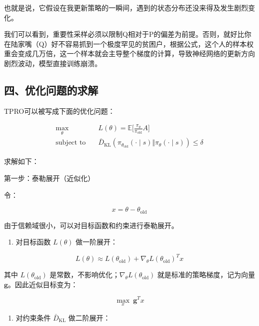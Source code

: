 也就是说，它假设在我更新策略的一瞬间，遇到的状态分布还没来得及发生剧烈变化。

我们可以看到，重要性采样必须以限制Q相对于P的偏差为前提。否则，就好比你在陆家嘴（Q）好不容易抓到一个极度罕见的贫困户，根据公式，这个人的样本权重会变成几万倍，这一个样本就会主导整个梯度的计算，导致神经网络的更新方向剧烈波动，模型直接训练崩溃。

\hypertarget{ux56dbux4f18ux5316ux95eeux9898ux7684ux6c42ux89e3}{%
\subsection{四、优化问题的求解}\label{ux56dbux4f18ux5316ux95eeux9898ux7684ux6c42ux89e3}}

TPRO可以被写成下面的优化问题：

\[
\begin{aligned}
\max_\theta\quad
& L(\theta)=\mathbb{E}
\bigl[
\frac{\pi_\theta}{\pi_{\mathrm{old}}}A
\bigr] \\
\text{subject to}\quad
& \bar{D}_{\mathrm{KL}}(
\pi_{\theta_{\mathrm{old}}}(\cdot\mid s)
\Vert
\pi_\theta(\cdot\mid s)
)\le \delta
\end{aligned}
\]

求解如下：

第一步：泰勒展开（近似化）

令：

\[
x=\theta-\theta_{\mathrm{old}}
\]

由于信赖域很小，可以对目标函数和约束进行泰勒展开。

\begin{enumerate}
\def\labelenumi{\arabic{enumi}.}
\tightlist
\item
{}
  对目标函数 \(L(\theta)\) 做一阶展开：
\end{enumerate}

\[
L(\theta)\approx
L(\theta_{\mathrm{old}})
+
\nabla_\theta L(\theta_{\mathrm{old}})^{T}x
\]

其中 \(L(\theta_{\mathrm{old}})\) 是常数，不影响优化；\(\nabla_\theta L(\theta_{\mathrm{old}})\) 就是标准的策略梯度，记为向量 \(\mathbf{g}\)。因此近似目标变为：

\[
\max_x\ \mathbf{g}^{T}x
\]

\begin{enumerate}
\def\labelenumi{\arabic{enumi}.}
\setcounter{enumi}{1}
\tightlist
\item
{}
  对约束条件 \(\bar{D}_{\mathrm{KL}}\) 做二阶展开：
\end{enumerate}

